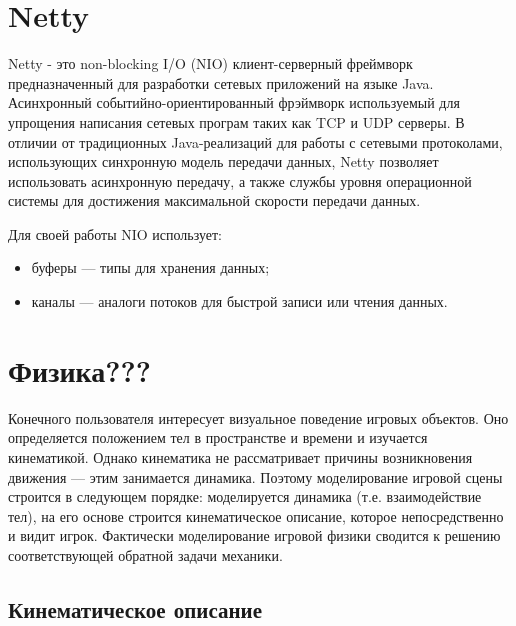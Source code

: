 \section{Netty}
Netty - это  non-blocking I/O (NIO)  клиент-серверный фреймворк предназначенный для разработки сетевых приложений на языке Java. Асинхронный событийно-ориентированный фрэймворк используемый для упрощения написания сетевых програм таких как TCP и UDP серверы. В отличии от традиционных Java-реализаций для работы с сетевыми протоколами, использующих синхронную модель передачи данных, Netty позволяет использовать асинхронную передачу, а также службы уровня операционной системы для достижения максимальной скорости передачи данных.

Для своей работы NIO использует:
\begin{itemize}
\item буферы — типы для хранения данных;
\item каналы — аналоги потоков для быстрой записи или чтения данных.
\end{itemize}


\section{Физика???}
Конечного пользователя интересует визуальное поведение игровых объектов.
Оно определяется положением тел в пространстве и времени и изучается кинематикой. Однако
кинематика не рассматривает причины возникновения движения --- этим занимается динамика. Поэтому
моделирование игровой сцены строится в следующем порядке: моделируется динамика (т.е. взаимодействие тел), на
его основе строится кинематическое описание, которое непосредственно и видит игрок. Фактически
моделирование игровой физики сводится к решению соответствующей обратной задачи механики.




\subsection{Кинематическое описание}
